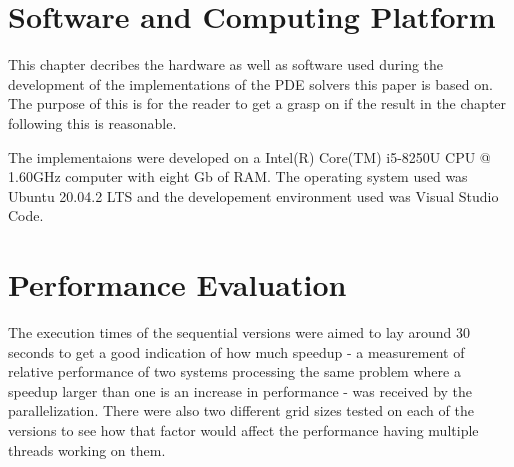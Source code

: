 \documentclass{article}
\begin{document}
\section{Software and Computing Platform}

This chapter decribes the hardware as well as software used during the development of the implementations of the PDE solvers this paper is based on. The purpose of this is for the reader to get a grasp on if the result in the chapter following this is reasonable.

The implementaions were developed on a Intel(R) Core(TM) i5-8250U CPU @ 1.60GHz computer with eight Gb of RAM. The operating system used was Ubuntu 20.04.2 LTS and the developement environment used was Visual Studio Code.


\section{Performance Evaluation}\label{performanceevaluation}


The execution times of the sequential versions were aimed to lay around 30 seconds to get a good indication of how much speedup - a measurement of relative performance of two systems processing the same problem where a speedup larger than one is an increase in performance - was received by the parallelization. There were also two different grid sizes tested on each of the versions to see how that factor would affect the performance having multiple threads working on them. 
\end{document}
